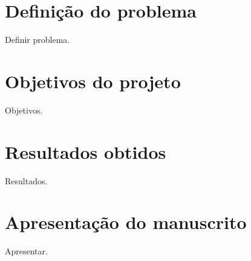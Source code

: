 \section{Definição do problema}

Definir problema.


\section{Objetivos do projeto}

Objetivos.


\section{Resultados obtidos}

Resultados.


\section{Apresentação do manuscrito}

Apresentar.
